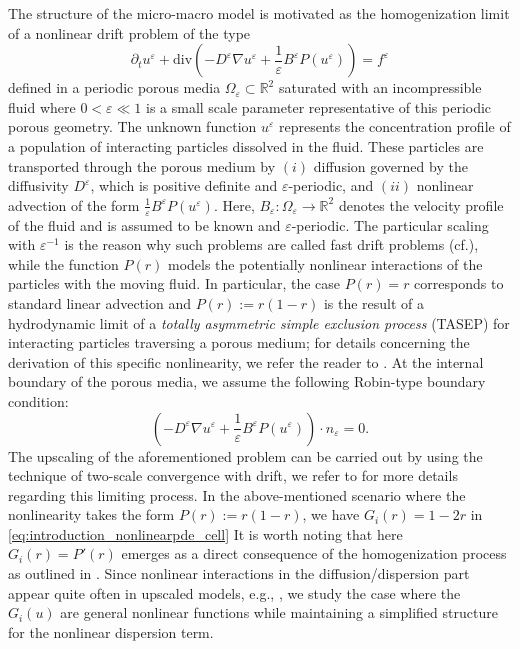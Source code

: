 \documentclass[11pt]{article}
\def\es{\varepsilon}
\begin{document}
{The structure of the micro-macro model is motivated as the homogenization limit of a nonlinear drift problem of the type
%
\begin{equation}\label{Eq:orgin}
       \partial_t u^{\varepsilon} +\mathrm{div}(-D^{\varepsilon}\nabla u^{\varepsilon}+ \frac{1}{\es}B^{\varepsilon}P(u^{\varepsilon}))=f^{\varepsilon}
\end{equation}
defined in a periodic porous media $\Omega_\varepsilon\subset\mathbb{R}^2$ saturated with an incompressible fluid where $0<\varepsilon\ll1$ is a small scale parameter representative of this periodic porous geometry. 
The unknown function $u^\es$ represents the concentration profile of a population of interacting particles dissolved in the fluid.
These particles are transported through the porous medium by $(i)$ diffusion governed by the diffusivity $D^\es$, which is positive definite and $\es$-periodic, and $(ii)$ nonlinear advection of the form $\frac{1}{\es}B^{\varepsilon}P(u^{\varepsilon})$.
Here, $B_\varepsilon\colon\Omega_\varepsilon\to\mathbb{R}^2$ denotes the velocity profile of the fluid and is assumed to be known and $\es$-periodic.
The particular scaling with $\es^{-1}$ is the reason why such problems are called fast drift problems (cf.\cite{Allaire_dispersion,allaire2016,ijioma2019fast}), while the function $P(r)$ models the potentially nonlinear interactions of the particles with the moving fluid.
In particular, the case $P(r)=r$ corresponds to standard linear advection and $P(r):=r(1-r)$ is the result of a hydrodynamic limit of a \textit{totally asymmetric simple exclusion process} (TASEP) for interacting particles traversing a porous medium; for details concerning the derivation of this specific nonlinearity, we refer the reader to \cite{CIRILLO2016436,raveendran2024scaling,cirillo2020upscaling,raveendran21}.
At the internal boundary of the porous media, we assume the following Robin-type boundary condition:
\begin{equation}
    (-D^{\varepsilon}\nabla u^{\varepsilon}+ \frac{1}{\es}B^{\varepsilon}P(u^{\varepsilon}))\cdot n_\es=0.
\end{equation}
}
\noindent
{The upscaling of the aforementioned problem can be carried out by using the technique of two-scale convergence with drift, we refer to \cite{raveendran2023homogenization} for more details regarding this limiting process. 
In the above-mentioned scenario where the nonlinearity takes the form $P(r):=r(1-r)$, we have $G_i(r)=1-2r$ in \cref{eq:introduction_nonlinearpde_cell}
It is worth noting that here $G_i(r)=P'(r)$ emerges as a direct consequence of the homogenization process as outlined in \cite{raveendran2023homogenization}.
Since nonlinear interactions in the diffusion/dispersion part appear quite often in upscaled models, e.g., \cite{marusik2005,allaire2016,ijioma2019fast,bringedal2020phase}, we study the case where the $G_i(u)$ are general nonlinear functions while maintaining a simplified structure for the nonlinear dispersion term.}  
\end{document}
